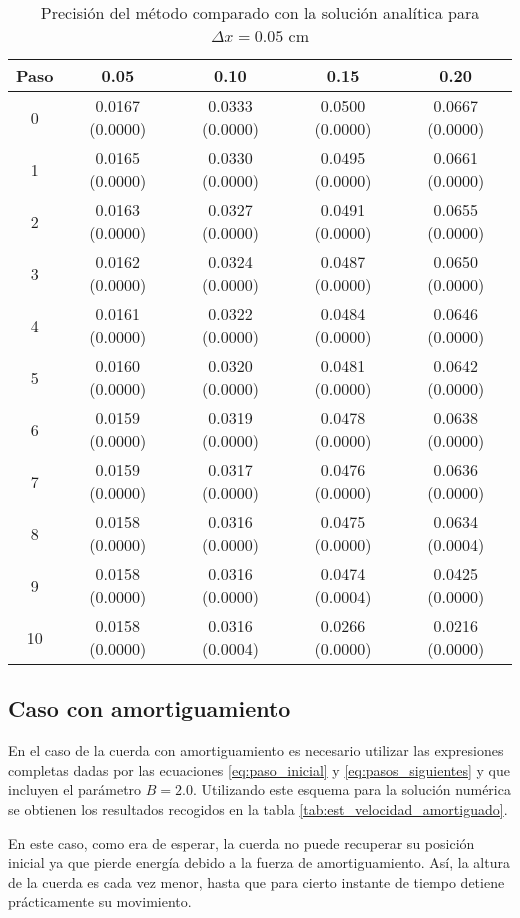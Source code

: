 \documentclass[11pt]{article}
\begin{document}
\begin{table}
\center
\begin{tabular}{ c c c c c }
\hline
Paso & 0.05 & 0.10 & 0.15 & 0.20 \\
\hline
\hline
0 & 0.0167 (0.0000) & 0.0333 (0.0000) & 0.0500 (0.0000) & 0.0667 (0.0000) \\
1 & 0.0165 (0.0000) & 0.0330 (0.0000) & 0.0495 (0.0000) & 0.0661 (0.0000) \\
2 & 0.0163 (0.0000) & 0.0327 (0.0000) & 0.0491 (0.0000) & 0.0655 (0.0000) \\
3 & 0.0162 (0.0000) & 0.0324 (0.0000) & 0.0487 (0.0000) & 0.0650 (0.0000) \\
4 & 0.0161 (0.0000) & 0.0322 (0.0000) & 0.0484 (0.0000) & 0.0646 (0.0000) \\
5 & 0.0160 (0.0000) & 0.0320 (0.0000) & 0.0481 (0.0000) & 0.0642 (0.0000) \\
6 & 0.0159 (0.0000) & 0.0319 (0.0000) & 0.0478 (0.0000) & 0.0638 (0.0000) \\
7 & 0.0159 (0.0000) & 0.0317 (0.0000) & 0.0476 (0.0000) & 0.0636 (0.0000) \\
8 & 0.0158 (0.0000) & 0.0316 (0.0000) & 0.0475 (0.0000) & 0.0634 (0.0004) \\
9 & 0.0158 (0.0000) & 0.0316 (0.0000) & 0.0474 (0.0004) & 0.0425 (0.0000) \\
10 & 0.0158 (0.0000) & 0.0316 (0.0004) & 0.0266 (0.0000) & 0.0216 (0.0000) \\
\end{tabular}
\caption{Precisión del método comparado con la solución analítica para $\Delta{x} = 0.05$ cm}
\label{tab:comparativa3}
\end{table}

\subsection{Caso con amortiguamiento}
En el caso de la cuerda con amortiguamiento es necesario utilizar las expresiones
completas dadas por las ecuaciones \eqref{eq:paso_inicial} y \eqref{eq:pasos_siguientes}
y que incluyen el parámetro $B = 2.0$.
Utilizando este esquema para la solución numérica se obtienen los resultados recogidos en
la tabla \ref{tab:est_velocidad_amortiguado}.

En este caso, como era de esperar, la cuerda no puede recuperar su posición inicial ya que
pierde energía debido a la fuerza de amortiguamiento. Así, la altura de la cuerda es 
cada vez menor, hasta que para cierto instante de tiempo detiene prácticamente su
movimiento.
\end{document}
